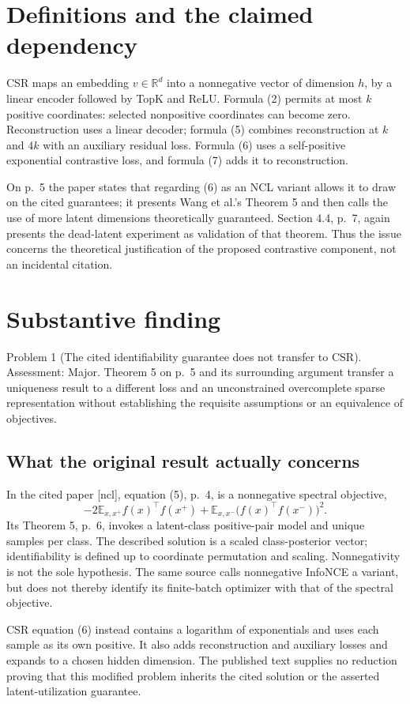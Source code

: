 \documentclass[10pt]{article}
\begin{document}
\section*{Definitions and the claimed dependency}
CSR maps an embedding \(v\in\mathbb R^d\) into a nonnegative vector of dimension \(h\), by a linear encoder followed by TopK and ReLU. Formula (2) permits at most \(k\) positive coordinates: selected nonpositive coordinates can become zero. Reconstruction uses a linear decoder; formula (5) combines reconstruction at \(k\) and \(4k\) with an auxiliary residual loss. Formula (6) uses a self-positive exponential contrastive loss, and formula (7) adds it to reconstruction.\par
On p. 5 the paper states that regarding (6) as an NCL variant allows it to draw on the cited guarantees; it presents Wang et al.’s Theorem 5 and then calls the use of more latent dimensions theoretically guaranteed. Section 4.4, p. 7, again presents the dead-latent experiment as validation of that theorem. Thus the issue concerns the theoretical justification of the proposed contrastive component, not an incidental citation.\par
\section*{Substantive finding}
Problem 1 (The cited identifiability guarantee does not transfer to CSR).  Assessment: Major. Theorem 5 on p. 5 and its surrounding argument transfer a uniqueness result to a different loss and an unconstrained overcomplete sparse representation without establishing the requisite assumptions or an equivalence of objectives.\par
\subsection*{What the original result actually concerns}
In the cited paper [ncl], equation (5), p. 4, is a nonnegative spectral objective, \[-2\mathbb E_{x,x^+} f(x)^\top f(x^+)
 +\mathbb E_{x,x^-}\bigl(f(x)^\top f(x^-)\bigr)^2.\] Its Theorem 5, p. 6, invokes a latent-class positive-pair model and unique samples per class. The described solution is a scaled class-posterior vector; identifiability is defined up to coordinate permutation and scaling. Nonnegativity is not the sole hypothesis. The same source calls nonnegative InfoNCE a variant, but does not thereby identify its finite-batch optimizer with that of the spectral objective.\par
CSR equation (6) instead contains a logarithm of exponentials and uses each sample as its own positive. It also adds reconstruction and auxiliary losses and expands to a chosen hidden dimension. The published text supplies no reduction proving that this modified problem inherits the cited solution or the asserted latent-utilization guarantee.\par
\end{document}
